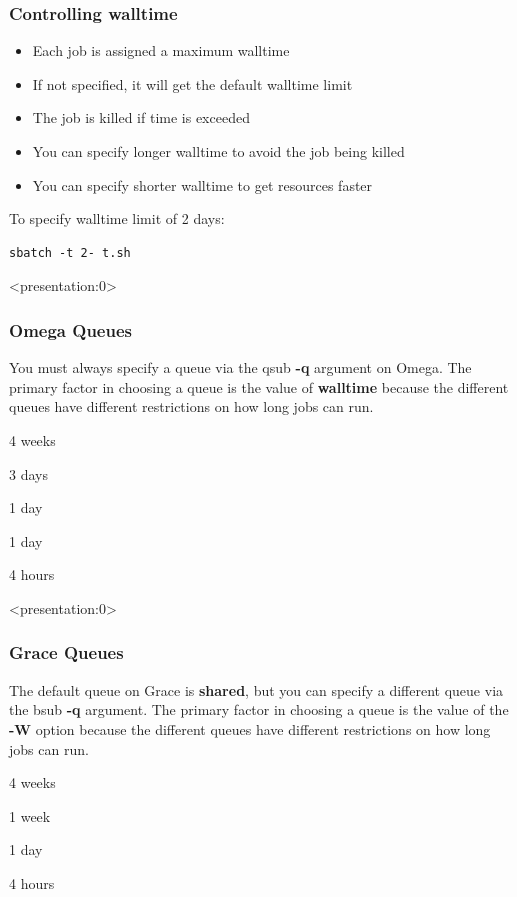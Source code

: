 \documentclass[10pt]{beamer}
\begin{document}
\begin{frame}[fragile]
\frametitle{Controlling walltime}
\begin{itemize}
\item Each job is assigned a maximum walltime
\item If not specified, it will get the default walltime limit
\item The job is killed if time is exceeded
\item You can specify longer walltime to avoid the job being killed
\item You can specify shorter walltime to get resources faster
\end{itemize}

To specify walltime limit of 2 days:
\begin{verbatim}
sbatch -t 2- t.sh

\end{verbatim}
\end{frame}

\begin{frame}<presentation:0>
\frametitle{Omega Queues}
You must always specify a queue via the qsub \textbf{-q} argument on
Omega.  The primary factor in choosing a queue is the value of
\textbf{walltime} because the different queues have different
restrictions on how long jobs can run.

\vskip10pt
\begin{description}
\item[fas\_very\_long]       4 weeks
\item[fas\_long]             3 days
\item[fas\_high]             1 day
\item[fas\_normal]           1 day
\item[fas\_devel]            4 hours
\end{description}

\end{frame}

\begin{frame}<presentation:0>
\frametitle{Grace Queues}
The default queue on Grace is \textbf{shared}, but you can specify
a different queue via the bsub \textbf{-q} argument.
The primary factor in choosing a queue is the value of the \textbf{-W}
option because the different queues have different restrictions on how
long jobs can run.

\vskip10pt
\begin{description}[interactive]
\item[long]                  4 weeks
\item[week]                  1 week
\item[shared]                1 day
\item[interactive]           4 hours
\end{description}

\end{frame}
\end{document}
